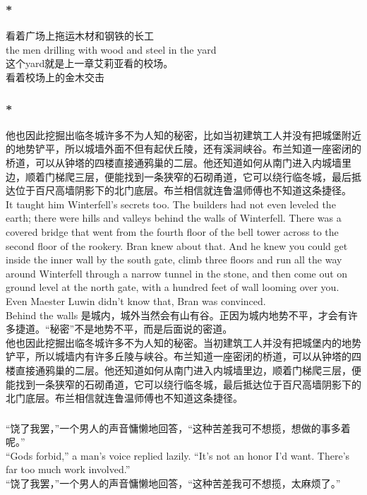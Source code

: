 \documentclass[12pt,a4paper]{article}
\newcommand{\h}[1]{{\color{red}#1}\\}
\newcommand{\la}[1]{{\color{blue}#1}\\}
\begin{document}
	
\subsubsection{\color{red}*}\la{
看着广场上拖运木材和钢铁的长工\\
the men drilling with wood and steel in the yard}
\h{这个yard就是上一章艾莉亚看的校场。}
看着校场上的金木交击


\subsubsection{\color{red}*}\la{
他也因此挖掘出临冬城许多不为人知的秘密，比如当初建筑工人并没有把城堡附近的地势铲平，所以城墙外面不但有起伏丘陵，还有溪涧峡谷。布兰知道一座密闭的桥道，可以从钟塔的四楼直接通鸦巢的二层。他还知道如何从南门进入内城墙里边，顺着门梯爬三层，便能找到一条狭窄的石砌甬道，它可以绕行临冬城，最后抵达位于百尺高墙阴影下的北门底层。布兰相信就连鲁温师傅也不知道这条捷径。\\
It taught him Winterfell's secrets too. The builders had not even leveled the earth; there were hills and valleys behind the walls of Winterfell. There was a covered bridge that went from the fourth floor of the bell tower across to the second floor of the rookery. Bran knew about that. And he knew you could get inside the inner wall by the south gate, climb three floors and run all the way around Winterfell through a narrow tunnel in the stone, and then come out on ground level at the north gate, with a hundred feet of wall looming over you. Even Maester Luwin didn't know that, Bran was convinced.}
\h{Behind the walls 是城内，城外当然会有山有谷。正因为城内地势不平，才会有许多捷道。“秘密”不是地势不平，而是后面说的密道。}
他也因此挖掘出临冬城许多不为人知的秘密。当初建筑工人并没有把城堡内的地势铲平，所以城墙内有许多丘陵与峡谷。布兰知道一座密闭的桥道，可以从钟塔的四楼直接通鸦巢的二层。他还知道如何从南门进入内城墙里边，顺着门梯爬三层，便能找到一条狭窄的石砌甬道，它可以绕行临冬城，最后抵达位于百尺高墙阴影下的北门底层。布兰相信就连鲁温师傅也不知道这条捷径。

	
	
\subsubsection{}\la{	
“饶了我罢，”一个男人的声音慵懒地回答，“这种苦差我可不想揽，想做的事多着呢。”\\
“Gods forbid,” a man's voice replied lazily. “It's not an honor I'd want. There's far too much work involved.”}
“饶了我罢，”一个男人的声音慵懒地回答，“这种苦差我可不想揽，太麻烦了。”
\end{document}
